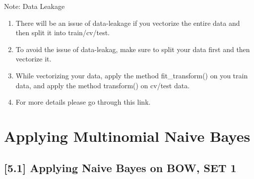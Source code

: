 \documentclass[11pt]{article}
\providecommand{\tightlist}{%
      \setlength{\itemsep}{0pt}\setlength{\parskip}{0pt}}
\begin{document}
    Note: Data Leakage

\begin{enumerate}
\def\labelenumi{\arabic{enumi}.}
\tightlist
\item
  There will be an issue of data-leakage if you vectorize the entire
  data and then split it into train/cv/test.
\item
  To avoid the issue of data-leakag, make sure to split your data first
  and then vectorize it.
\item
  While vectorizing your data, apply the method fit\_transform() on you
  train data, and apply the method transform() on cv/test data.
\item
  For more details please go through this link.
\end{enumerate}

    \section{Applying Multinomial Naive
Bayes}\label{applying-multinomial-naive-bayes}

    \subsection{{[}5.1{]} Applying Naive Bayes on BOW, SET
1}\label{applying-naive-bayes-on-bow-set-1}
\end{document}
